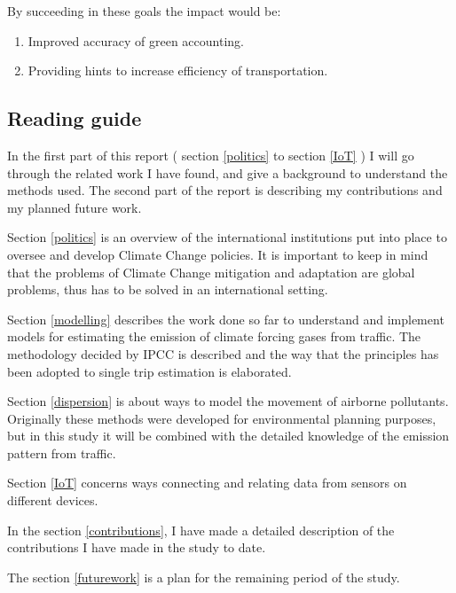 By succeeding in these goals the impact would be:
\begin{enumerate}
  	\item 	Improved accuracy of green accounting.
	\item		Providing hints to increase efficiency of transportation.
\end{enumerate}
	
\subsection{Reading guide}
In the first part of this report ( section \ref{politics} to section \ref{IoT} ) I will go through the related work I have found, and give a background to understand the methods used. The second part of the report is describing my contributions and my planned future work. 

Section \ref{politics} is an overview of the international institutions put into place to oversee and develop Climate Change policies. It is important to keep in mind that the problems of Climate Change mitigation and adaptation are global problems, thus has to be solved in an international setting.

Section \ref{modelling} describes the work done so far to understand and implement models for estimating the emission of climate forcing gases from traffic. The methodology decided by IPCC is described and the way that the principles has been adopted to single trip estimation is elaborated.

Section \ref{dispersion} is about ways to model the movement of airborne pollutants. Originally these methods were developed for environmental planning purposes, but in this study it will be combined with the detailed knowledge of the emission pattern from traffic.

Section \ref{IoT} concerns ways connecting and relating data from sensors on different devices.

In the section \ref{contributions}, I have made a detailed description of the contributions I have made in the study to date.

The section \ref{futurework} is a plan for the remaining period of the study.


